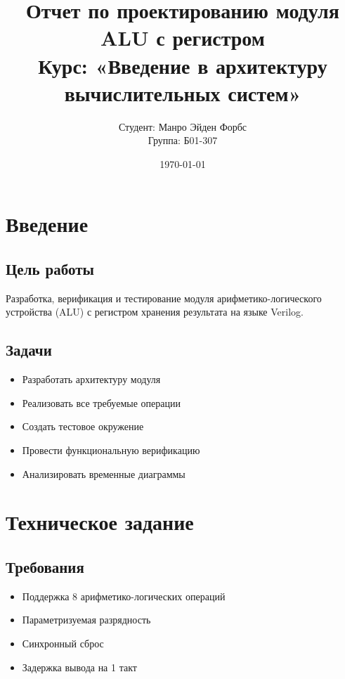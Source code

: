 \documentclass[a4paper,12pt]{article}
\title{
    \vspace{2cm}
    \textbf{Отчет по проектированию модуля ALU с регистром} \\
    \large Курс: «Введение в архитектуру вычислительных систем»
}
\author{
    Студент: Манро Эйден Форбс \\
    Группа: Б01-307 \\
}
\date{\today}
\begin{document}
\maketitle
\thispagestyle{empty}

\newpage
\tableofcontents
\newpage

\section{Введение}
\subsection{Цель работы}
Разработка, верификация и тестирование модуля арифметико-логического устройства (ALU) с регистром хранения результата на языке Verilog.

\subsection{Задачи}
\begin{itemize}
    \item Разработать архитектуру модуля
    \item Реализовать все требуемые операции
    \item Создать тестовое окружение
    \item Провести функциональную верификацию
    \item Анализировать временные диаграммы
\end{itemize}

\section{Техническое задание}
\subsection{Требования}
\begin{itemize}
    \item Поддержка 8 арифметико-логических операций
    \item Параметризуемая разрядность
    \item Синхронный сброс
    \item Задержка вывода на 1 такт
\end{itemize}
\end{document}
